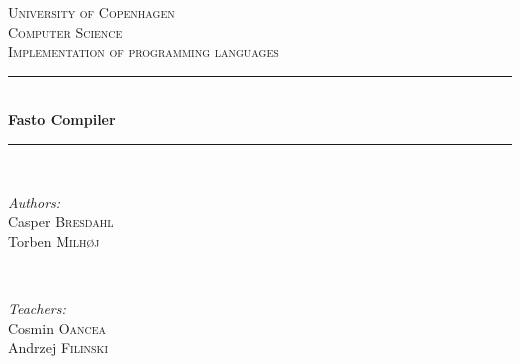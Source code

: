 \documentclass{article}                                                        %
\begin{document}
\begin{titlepage}

\newcommand{\HRule}{\rule{\linewidth}{0.5mm}} %

\begin{center}
 

\textsc{\LARGE University of Copenhagen}\\[1.5cm] %
\textsc{\Large Computer Science}\\[0.5cm] %
\textsc{\large Implementation of programming languages}\\[0.5cm] %


\HRule \\[0.4cm]
{ \huge \bfseries Fasto Compiler}\\[0.4cm] %
\HRule \\[1.5cm]
 

\begin{minipage}{0.4\textwidth}
\begin{flushleft} \large
\emph{Authors:}\\ 
Casper \textsc{Bresdahl}\\
Torben \textsc{Milhøj}\\
\end{flushleft}
\end{minipage}
~
\begin{minipage}{0.4\textwidth}
\begin{flushright} \large
\emph{Teachers:} \\
Cosmin \textsc{Oancea}\\
Andrzej \textsc{Filinski}\\
\end{flushright}
\end{minipage}\\[2cm]


\end{center}
\end{titlepage}
\end{document}

